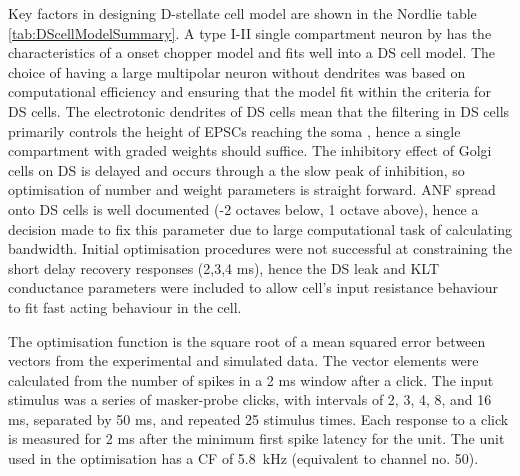 \medskip{}

Key factors in designing D-stellate cell model are shown in the Nordlie table
\ref{tab:DScellModelSummary}. A type I-II single compartment neuron by
\citet{RothmanManis:2003b} has the characteristics of a onset chopper model and
fits well into a DS cell model. The choice of having a large multipolar neuron
without dendrites was based on computational efficiency and ensuring that the
model fit within the criteria for DS cells. The electrotonic dendrites of DS
cells mean that the filtering in DS cells primarily controls the height of EPSCs
reaching the soma \citep{WhiteYoungEtAl:1994}, hence a single compartment with
graded weights should suffice. The inhibitory effect of Golgi cells on DS is
delayed and occurs through a the slow peak of \GABAa inhibition, so optimisation
of number and weight parameters is straight forward. ANF spread onto DS cells is
well documented (-2 octaves below, 1 octave above), hence a decision made to fix
this parameter due to large computational task of calculating bandwidth. Initial
optimisation procedures were not successful at constraining the short delay
recovery responses (2,3,4 ms), hence the DS leak and KLT conductance parameters
were included to allow cell's input resistance behaviour to fit fast acting
behaviour in the cell.


\medskip{}


The optimisation function is the square root of a mean squared error between vectors from
the experimental and simulated data. The vector elements were calculated from
the number of spikes in a 2 ms window after a click.  The input stimulus was a
series of masker-probe clicks, with intervals of 2, 3, 4, 8, and 16 ms,
separated by 50 ms, and repeated 25 stimulus times. Each response to a click is
measured for 2 ms after the minimum first spike latency for the unit.  The unit
used in the optimisation has a CF of 5.8~kHz (equivalent to channel no. 50).






